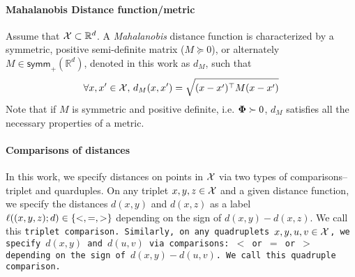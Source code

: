 \paragraph{Mahalanobis Distance function/metric}
Assume that \({\mathcal{X}} \subset \mathbb{R}^d\). A \textit{Mahalanobis} distance function is characterized by a symmetric, positive semi-definite matrix ($M \succeq 0$), or alternately \(M \in \textsf{symm}_{+}(\mathbb{R}^d)\), denoted in this work as \(d_M\), such that 
\begin{align}
    \forall x, x' \in {\mathcal{X}},\, d_M(x, x') = \sqrt{(x - x')^{\top}M(x - x')} \label{eq: maha}
\end{align}
Note that if \(M\) is symmetric and positive definite, i.e. $\boldsymbol{\Phi} \succ 0$, \(d_M\) satisfies all the necessary properties of a metric. 



\paragraph{Comparisons of distances} In this work, we specify distances on points in ${\mathcal{X}}$ via two types of comparisons-- triplet and quarduples. On any triplet $x,y,z \in {\mathcal{X}}$ and a given distance function, we specify the distances $d(x,y)$ and $d(x,z)$ as a label $\ell((x,y,z);d) \in \left\{<,=,>\right\}$ depending on the sign of $d(x,y) - d(x,z)$. We call this \tt{triplet comparison}. Similarly, on any quadruplets $x,y,u,v \in {\mathcal{X}}$, we specify $d(x,y)$ and $d(u,v)$ via comparisons: $<$ or $=$ or $>$ depending on the sign of $d(x,y) - d(u,v)$. We call this \tt{quadruple comparison}. 


